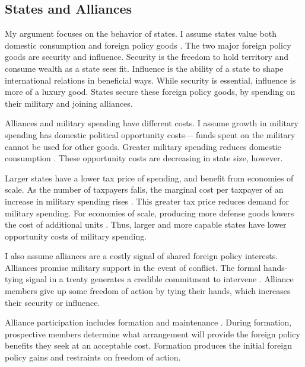 \documentclass[12pt]{article}
\begin{document}
\subsection{States and Alliances}


My argument focuses on the behavior of states. 
I assume states value both domestic consumption and foreign policy goods \citep{Powell1993, Fearon2018}. 
The two major foreign policy goods are security and influence. 
Security is the freedom to hold territory and consume wealth as a state sees fit. 
Influence is the ability of a state to shape international relations in beneficial ways. 
While security is essential, influence is more of a luxury good. 
States secure these foreign policy goods, by spending on their military and joining alliances. 


Alliances and military spending have different costs. 
I assume growth in military spending has domestic political opportunity costs--- funds spent on the military cannot be used for other goods. 
Greater military spending reduces domestic consumption \citep{Fearon2018}. 
These opportunity costs are decreasing in state size, however. 


Larger states have a lower tax price of spending, and benefit from economies of scale. 
As the number of taxpayers falls, the marginal cost per taxpayer of an increase in military spending rises \citep{DudleyMontmarquette1981}. 
This greater tax price reduces demand for military spending. 
For economies of scale, producing more defense goods lowers the cost of additional units \citep{Moravcsik1991, AlesinaSpolaore2006}. 
Thus, larger and more capable states have lower opportunity costs of military spending. 


I also assume alliances are a costly signal of shared foreign policy interests. 
Alliances promise military support in the event of conflict. 
The formal hands-tying signal in a treaty generates a credible commitment to intervene \citep{Fearon1997, Leeds2003}.
Alliance members give up some freedom of action by tying their hands, which increases their security or influence. 


Alliance participation includes formation and maintenance \citep{Snyder1997}. 
During formation, prospective members determine what arrangement will provide the foreign policy benefits they seek at an acceptable cost. 
Formation produces the initial foreign policy gains and restraints on freedom of action. 
\end{document}
